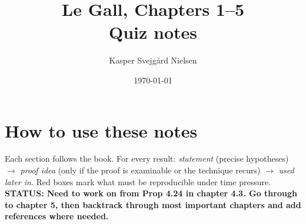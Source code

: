 \documentclass[11pt]{article}
\title{Le Gall, Chapters 1--5\\[2pt]\large Quiz notes}
\author{Kasper Svejgård Nielsen}
\date{\today}
\theoremstyle{definition}
\theoremstyle{plain}
\theoremstyle{definition}
\theoremstyle{plain}
\theoremstyle{definition}
\begin{document}
\maketitle
\tableofcontents
\newpage

\section*{How to use these notes}
Each section follows the book. For every result:
\emph{statement} (precise hypotheses) $\to$ \emph{proof idea} (only if the
proof is examinable or the technique recurs) $\to$ \emph{used later in}.
Red boxes mark what must be reproducible under time pressure.
\\
\textbf{STATUS: Need to work on from Prop 4.24 in chapter 4.3. Go through to chapter 5, then backtrack through most important chapters and add references where needed.}

\setcounter{section}{-1}













\setcounter{section}{6}


\setcounter{section}{7}





\printbibliography
\end{document}
